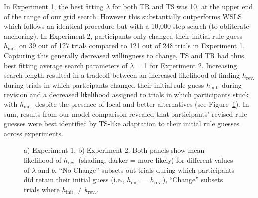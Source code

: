\documentclass[doc,natbib,floatsintext]{apa7}
\newcommand{\hr}{h_{\mathrm{rev.}}}
\newcommand{\hi}{h_{\mathrm{init.}}}
\begin{document}
In Experiment 1, the best fitting $\lambda$ for both TR and TS was 10, at the upper end of the range of our grid search. However this substantially outperforms WSLS which follows an identical procedure but with a 10,000 step search (to obliterate anchoring). In Experiment 2, participants only changed their initial rule guess $\hi$ on 39 out of 127 trials compared to 121 out of 248 trials in Experiment 1. Capturing this generally decreased willingness to change, TS and TR had thus best fitting average search parameters of $\lambda$ = 1 for Experiment 2. Increasing search length resulted in a tradeoff between an increased likelihood of finding $\hr$ during trials in which participants changed their initial rule guess $\hi$ during revision and a decreased likelihood assigned to trials in which participants stuck with $\hi$ despite the presence of local and better alternatives (see Figure~\ref{fig:fig_8_tr_ts_h_rev}). In sum, results from our model comparison revealed that participants' revised rule guesses were best identified by TS-like adaptation to their initial rule guesses across experiments.

\begin{figure}[!ht]
    \begin{center}
    \end{center}
    \caption{a) Experiment 1. b) Experiment 2. Both panels show mean likelihood of $\hr$ (shading, darker = more likely) for different values of $\lambda$ and $b$. ``No Change'' subsets out trials during which participants did retain their initial guess (i.e., $\hi$ = $\hr$), ``Change'' subsets trials where $\hi\neq\hr$.
    }
    \label{fig:fig_8_tr_ts_h_rev}
\end{figure}
\end{document}
